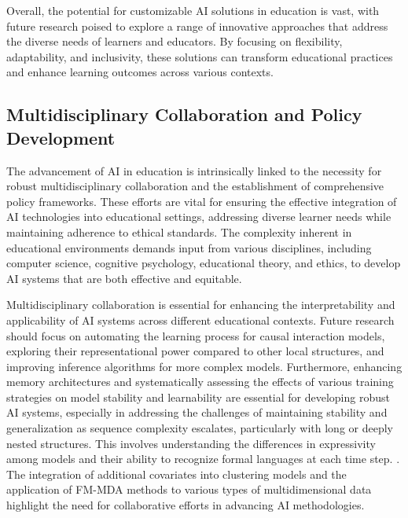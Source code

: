 Overall, the potential for customizable AI solutions in education is vast, with future research poised to explore a range of innovative approaches that address the diverse needs of learners and educators. By focusing on flexibility, adaptability, and inclusivity, these solutions can transform educational practices and enhance learning outcomes across various contexts.



\subsection{Multidisciplinary Collaboration and Policy Development} \label{subsec:Multidisciplinary Collaboration and Policy Development}

The advancement of AI in education is intrinsically linked to the necessity for robust multidisciplinary collaboration and the establishment of comprehensive policy frameworks. These efforts are vital for ensuring the effective integration of AI technologies into educational settings, addressing diverse learner needs while maintaining adherence to ethical standards. The complexity inherent in educational environments demands input from various disciplines, including computer science, cognitive psychology, educational theory, and ethics, to develop AI systems that are both effective and equitable.



Multidisciplinary collaboration is essential for enhancing the interpretability and applicability of AI systems across different educational contexts. Future research should focus on automating the learning process for causal interaction models, exploring their representational power compared to other local structures, and improving inference algorithms for more complex models. Furthermore, enhancing memory architectures and systematically assessing the effects of various training strategies on model stability and learnability are essential for developing robust AI systems, especially in addressing the challenges of maintaining stability and generalization as sequence complexity escalates, particularly with long or deeply nested structures. This involves understanding the differences in expressivity among models and their ability to recognize formal languages at each time step. \cite{das2024exploringlearnabilitymemoryaugmentedrecurrent}. The integration of additional covariates into clustering models and the application of FM-MDA methods to various types of multidimensional data highlight the need for collaborative efforts in advancing AI methodologies.



